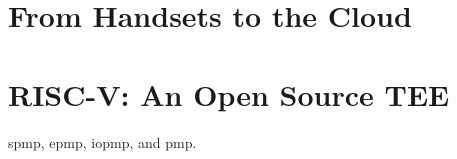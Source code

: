 \section{From Handsets to the Cloud}

\section{RISC-V: An Open Source TEE}
\gls{spmp}, \gls{epmp}, \gls{iopmp}, and \gls{pmp}.


